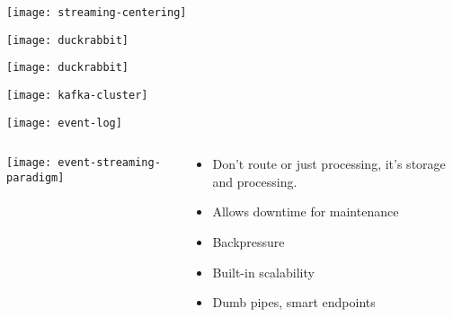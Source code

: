 \documentclass[aspectratio=169, 15pt,usenames,dvipsnames]{beamer}
\begin{document}
\begin{gdsw}
	\centering\texttt{[image: streaming-centering]}         
\end{gdsw}
\begin{gdsw}
	\centering\texttt{[image: duckrabbit]}         
	\par
\end{gdsw}
\begin{gdsw}
	\centering\texttt{[image: duckrabbit]}         
	\par
\end{gdsw}
\begin{gdsw}
	\centering\texttt{[image: kafka-cluster]}  
	\par       
\end{gdsw}
\begin{gdsw}
	\centering\texttt{[image: event-log]}  
	\par       
\end{gdsw}
\begin{gdsw}
	\begin{columns}
		\begin{column}{0.4\textwidth}
			\centering\texttt{[image: event-streaming-paradigm]} 
		\end{column}
		\begin{column}{0.6\textwidth}
			\large
			\begin{itemize}
				\item Don't route or just processing, it's storage and processing.
				\pause
				\item Allows downtime for maintenance
				\pause
				\item Backpressure
				\item Built-in scalability
				\item Dumb pipes, smart endpoints
			\end{itemize}	
		\end{column}
	\end{columns}
\end{gdsw}
\end{document}

